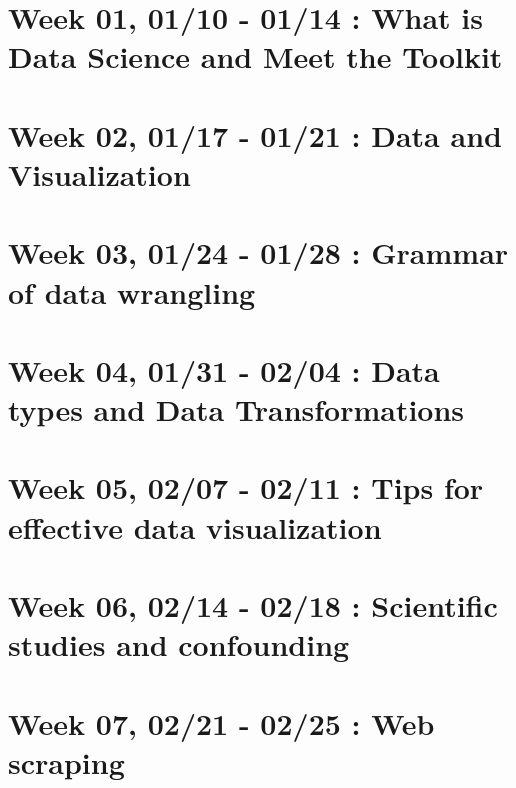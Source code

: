 \documentclass[
]{book}
\begin{document}
\hypertarget{week-01-0110---0114-what-is-data-science-and-meet-the-toolkit}{%
\section{Week 01, 01/10 - 01/14 : What is Data Science and Meet the Toolkit}\label{week-01-0110---0114-what-is-data-science-and-meet-the-toolkit}}

\hypertarget{week-02-0117---0121-data-and-visualization}{%
\section{Week 02, 01/17 - 01/21 : Data and Visualization}\label{week-02-0117---0121-data-and-visualization}}

\hypertarget{week-03-0124---0128-grammar-of-data-wrangling}{%
\section{Week 03, 01/24 - 01/28 : Grammar of data wrangling}\label{week-03-0124---0128-grammar-of-data-wrangling}}

\hypertarget{week-04-0131---0204-data-types-and-data-transformations}{%
\section{Week 04, 01/31 - 02/04 : Data types and Data Transformations}\label{week-04-0131---0204-data-types-and-data-transformations}}

\hypertarget{week-05-0207---0211-tips-for-effective-data-visualization}{%
\section{Week 05, 02/07 - 02/11 : Tips for effective data visualization}\label{week-05-0207---0211-tips-for-effective-data-visualization}}

\hypertarget{week-06-0214---0218-scientific-studies-and-confounding}{%
\section{Week 06, 02/14 - 02/18 : Scientific studies and confounding}\label{week-06-0214---0218-scientific-studies-and-confounding}}

\hypertarget{week-07-0221---0225-web-scraping}{%
\section{Week 07, 02/21 - 02/25 : Web scraping}\label{week-07-0221---0225-web-scraping}}
\end{document}
